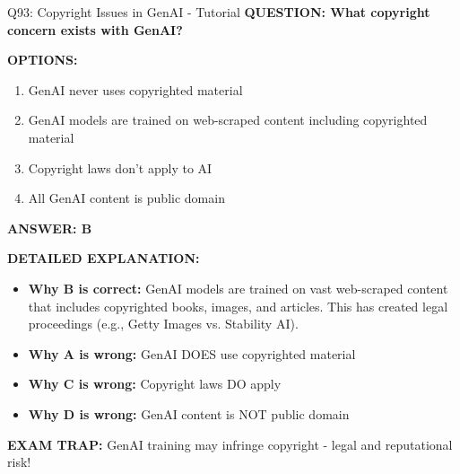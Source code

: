 \documentclass[8pt]{beamer}
\begin{document}
	\begin{frame}{Q93: Copyright Issues in GenAI - Tutorial}
		\fontsize{6.5}{7.5}\selectfont
		\textbf{QUESTION: What copyright concern exists with GenAI?}
		
		\vspace{0.1cm}
		\textbf{OPTIONS:}
		\begin{enumerate}
			\item GenAI never uses copyrighted material
			\item GenAI models are trained on web-scraped content including copyrighted material
			\item Copyright laws don't apply to AI
			\item All GenAI content is public domain
		\end{enumerate}
		
		\vspace{0.1cm}
		\textcolor{myblue}{\textbf{ANSWER: B}}
		
		\vspace{0.1cm}
		\textbf{DETAILED EXPLANATION:}
		\begin{itemize}
			\item \textbf{Why B is correct:} GenAI models are trained on vast web-scraped content that includes copyrighted books, images, and articles. This has created legal proceedings (e.g., Getty Images vs. Stability AI).
			\item \textbf{Why A is wrong:} GenAI DOES use copyrighted material
			\item \textbf{Why C is wrong:} Copyright laws DO apply
			\item \textbf{Why D is wrong:} GenAI content is NOT public domain
		\end{itemize}
		
		\textcolor{myred}{\textbf{EXAM TRAP:}} GenAI training may \textcolor{myblue}{infringe copyright} - legal and reputational risk!
	\end{frame}
	
\end{document}
